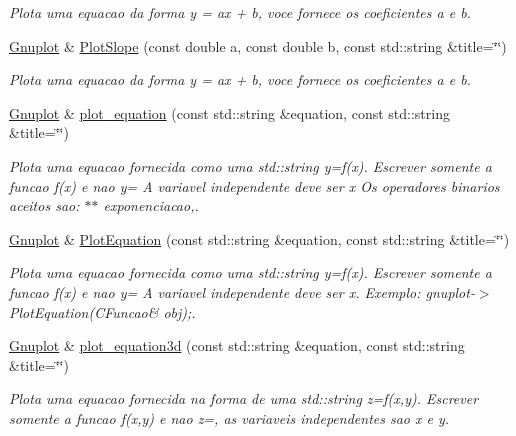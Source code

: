 \begin{DoxyCompactItemize}
\begin{DoxyCompactList}\small\item\em Plota uma equacao da forma y = ax + b, voce fornece os coeficientes a e b. \end{DoxyCompactList}\item 
\hyperlink{class_gnuplot}{Gnuplot} \& \hyperlink{class_gnuplot_af4c2215781aa7a32ba73caa26941407c}{Plot\+Slope} (const double a, const double b, const std\+::string \&title=\char`\"{}\char`\"{})
\begin{DoxyCompactList}\small\item\em Plota uma equacao da forma y = ax + b, voce fornece os coeficientes a e b. \end{DoxyCompactList}\item 
\hyperlink{class_gnuplot}{Gnuplot} \& \hyperlink{class_gnuplot_a42dfb8c9d4636745c7be277ed818e849}{plot\+\_\+equation} (const std\+::string \&equation, const std\+::string \&title=\char`\"{}\char`\"{})
\begin{DoxyCompactList}\small\item\em Plota uma equacao fornecida como uma std\+::string y=f(x). Escrever somente a funcao f(x) e nao y= A variavel independente deve ser x Os operadores binarios aceitos sao\+: $\ast$$\ast$ exponenciacao,. \end{DoxyCompactList}\item 
\hyperlink{class_gnuplot}{Gnuplot} \& \hyperlink{class_gnuplot_a901b030726d78e791f7005acf987bc44}{Plot\+Equation} (const std\+::string \&equation, const std\+::string \&title=\char`\"{}\char`\"{})
\begin{DoxyCompactList}\small\item\em Plota uma equacao fornecida como uma std\+::string y=f(x). Escrever somente a funcao f(x) e nao y= A variavel independente deve ser x. Exemplo\+: gnuplot-\/$>$Plot\+Equation(\+C\+Funcao\& obj);. \end{DoxyCompactList}\item 
\hyperlink{class_gnuplot}{Gnuplot} \& \hyperlink{class_gnuplot_a79aed3a6927f7d1d3497cba441e8a943}{plot\+\_\+equation3d} (const std\+::string \&equation, const std\+::string \&title=\char`\"{}\char`\"{})
\begin{DoxyCompactList}\small\item\em Plota uma equacao fornecida na forma de uma std\+::string z=f(x,y). Escrever somente a funcao f(x,y) e nao z=, as variaveis independentes sao x e y. \end{DoxyCompactList}\item 

\end{DoxyCompactItemize}
